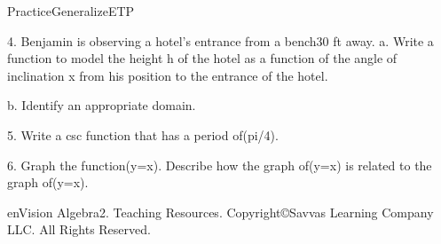 \documentclass{article}
\newenvironment{te-addendum}[2]{}{}     %
\newcommand{\answer}[1]{}               %
\newcommand{\placeholder}[2]{}          %
\newcommand{\te}[1]{}                   %
\begin{document}
\begin{te-addendum}{Practice}{GeneralizeETP}
\placeholder{graph}{Magenta2cot(.25x),blackarrowedx,yaxes,O;xgridpi/2 labels-pi,pi;ygrid5 labels-20,-10,10,20;window-2pi..2pi,-25..25. Two decreasing reciprocal-like branchesapproachverticalx0,zerosat+-2pi,notdrawnasdashed;no curvearrowheads.}
4. Benjamin is observing a hotel's entrance from a bench30 ft away.
a. Write a function to model the height h of the hotel as a function of the angle of inclination x from his position to the entrance of the hotel.
\answer{a.(y=30\tan x)}
b. Identify an appropriate domain.
\answer{b.Answers may vary. Sample:(-\pi<x<\pi)}
\te{Printed domain includes undefined values and negative heights; likely0<x<pi/2 in this context. Printed answer uses y instead of h.}
5. Write a csc function that has a period of(pi/4).
\answer{(y=\csc8x)}
6. Graph the function(y=\sec x). Describe how the graph of(y=\sec x) is related to the graph of(y=\cos x).
\answer{(y=\sec x) is the reciprocal of(y=\cos x).}
\placeholder{graph}{Magenta sec x and black cos x onblackarrowed x,y axes,O;xgridpi/2 labels-2pi,2pi;ygrid1 labels-4,-2,2,4;window-3pi..3pi,-5..5. Magentaupvertices(-2pi,1),(0,1),(2pi,1),downvertices(+-pi,-1);blackcosinepassesallvertices,amplitude1;secantasymptotes oddpi/2 notdrawn;no explicitcurvearrows.}
enVision Algebra2. Teaching Resources. Copyright©Savvas Learning Company LLC. All Rights Reserved.
\end{te-addendum}
\end{document}
